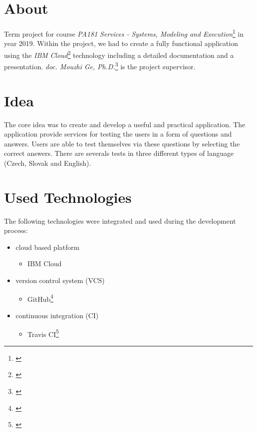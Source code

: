 \documentclass[11pt,a4paper]{article}
\begin{document}
\setlength{\parskip}{0pt}
    \hypersetup{hidelinks}\tableofcontents
\setlength{\parskip}{0pt}

\newpage

\section{About}

Term project for course \textit{PA181 Services - Systems, Modeling and Execution}\footnote{\href{https://is.muni.cz/predmet/fi/jaro2019/PA181}{\color{urlColor}{is.muni.cz/predmet/fi/jaro2019/PA181}}} in year 2019. Within the project, we had to create a fully functional application using the \textit{IBM Cloud}\footnote{\href{https://cloud.ibm.com/}{\color{urlColor}{cloud.ibm.com}}} technology including a detailed documentation and a presentation. \textit{doc. Mouzhi Ge, Ph.D.}\footnote{\href{https://is.muni.cz/auth/osoba/239833}{\color{urlColor}{is.muni.cz/auth/osoba/239833}}} is the project supervisor.

\section{Idea}

The core idea was to create and develop a useful and practical application. The application provide services for testing the users in a form of questions and answers. Users are able to test themselves via these questions by selecting the correct answers. There are severals tests in three different types of language (Czech, Slovak and English).

\section{Used Technologies}

The following technologies were integrated and used during the development process:
\begin{itemize}
    \item cloud based platform
    \begin{itemize}
        \item IBM Cloud
    \end{itemize}

    \item version control system (VCS)
    \begin{itemize}
        \item GitHub\footnote{\href{https://github.com/}{\color{urlColor}{github.com}}}
    \end{itemize}

    \item continuous integration (CI)
    \begin{itemize}
        \item Travis CI\footnote{\href{https://travis-ci.org/}{\color{urlColor}{travis-ci.org}}}
    \end{itemize}
\end{itemize}
\end{document}
